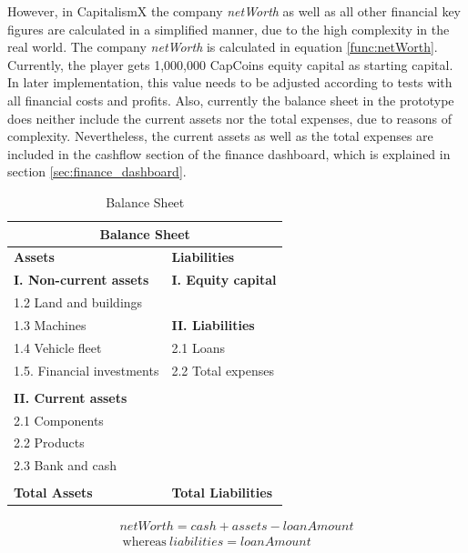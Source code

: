 However, in CapitalismX the company \textit{netWorth} as well as all other financial key figures are calculated in a simplified manner, due to the high complexity in the real world. The company \textit{netWorth} is calculated in equation \ref{func:netWorth}. Currently, the player gets 1,000,000 CapCoins equity capital as starting capital. In later implementation, this value needs to be adjusted according to tests with all financial costs and profits. Also, currently the balance sheet in the prototype does neither include the current assets nor the total expenses, due to reasons of complexity. Nevertheless, the current assets as well as the total expenses are included in the cashflow %
section of the finance dashboard, which is explained in section \ref{sec:finance_dashboard}.

\begin{table}[ht]
\begin{tabular}{|p{5.8cm}|p{5.8cm}|}
\hline
\multicolumn{2}{|c|}{\textbf{Balance Sheet}}\\
\hline \textbf{Assets} & \textbf{Liabilities}\\ 
\hline \textbf{I. Non-current assets} & \textbf{I. Equity capital}\\
\hline 1.2 Land and buildings &\\
\hline 1.3 Machines & \textbf{II. Liabilities}\\
\hline 1.4 Vehicle fleet & 2.1 Loans\\
\hline 1.5. Financial investments &  2.2 Total expenses\\
\hline &\\
\hline \textbf{II. Current assets} &\\
\hline 2.1 Components &\\
\hline 2.2 Products &\\
\hline 2.3 Bank and cash &\\
\hline &\\
\hline \textbf{Total Assets} & \textbf{Total Liabilities}\\
\hline
\end{tabular}
\caption{Balance Sheet}
\label{tab:balanceSheet}
\end{table}

\begin{equation}
\label{func:netWorth}
\begin{split}
    netWorth = cash + assets - loanAmount \\ ~\text{whereas}~liabilities = loanAmount
    \end{split}
\end{equation}

